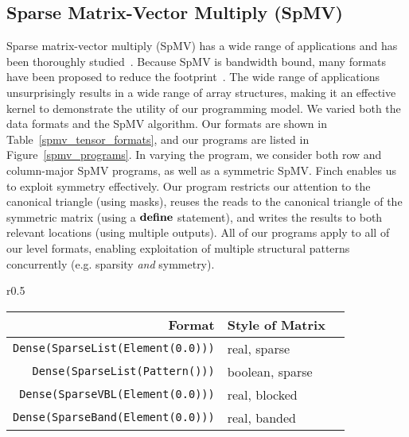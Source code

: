   \subsection{Sparse Matrix-Vector Multiply (SpMV)}
  Sparse matrix-vector multiply (SpMV) has a wide range of applications and has been thoroughly studied~\cite{liu_csr5_2015,
  zhou_enabling_2020}. 
  Because SpMV is bandwidth bound, many formats have
  been proposed to reduce the footprint~\cite{langr_evaluation_2016}. 
  The wide range of applications unsurprisingly
  results in a wide range of array structures, making it an effective kernel to
  demonstrate the utility of our programming model. 
  We varied both the data formats and the SpMV algorithm. 
  Our formats
  are shown in Table~\ref{spmv_tensor_formats}, and our programs are listed in
  Figure~\ref{spmv_programs}.
  In varying the program, we consider both row and column-major SpMV programs, as
  well as a symmetric SpMV. 
  Finch enables us to exploit symmetry
  effectively.
  Our program restricts our attention to the canonical triangle (using
  masks), reuses the reads to the canonical triangle of the symmetric matrix
  (using a $\text{\textbf{define}}$ statement), and writes the results to both relevant
  locations (using multiple outputs).
  All of our programs apply to all of our level formats, enabling exploitation of multiple structural patterns concurrently (e.g. sparsity \textit{and} symmetry).
   
  \begin{wrapfigure}{r}{0.5\linewidth}
    \scriptsize
    \centering
    \vspace{-14pt}
    \begin{tabular}{|r|l|l|}
        \hline
        \textbf{Format} & \textbf{Style of Matrix}\\
        \hline
        \texttt{Dense(SparseList(Element(0.0)))} & real, sparse \\
        \texttt{Dense(SparseList(Pattern()))} & boolean, sparse \\
        \texttt{Dense(SparseVBL(Element(0.0)))} & real, blocked \\
        \texttt{Dense(SparseBand(Element(0.0)))} & real, banded \\
        \hline 
    \end{tabular}
      \vspace{-8pt}
    \caption{SpMV Tensor Formats}
    \label{spmv_tensor_formats}
    \vspace{-8pt}
  \end{wrapfigure} 

